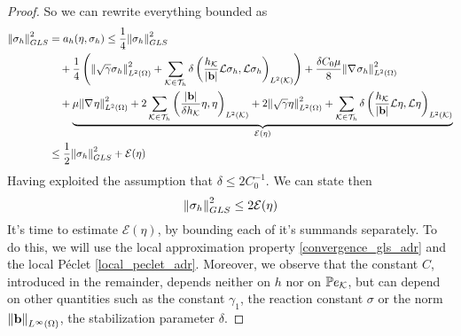 \begin{proof}
    So we can rewrite everything bounded as 
    \begin{align*}
        \norm{\sigma_h}^2_{GLS} &= a_h(\eta, \sigma_h) \leq \frac{1}{4} \norm{\sigma_h}^2_{GLS} \\
        &\quad + \frac{1}{4} \left( \norm{\sqrt{\gamma}\sigma_h}_{L^2(\Omega)}^2 + \sum_{\mathcal{K}\in\mathcal{T}_h} \delta \left( \frac{h_{\mathcal{K}}}{\abs{\textbf{b}}} \mathcal{L}\sigma_h,\mathcal{L} \sigma_h \right)_{L^2(\mathcal{K})} \right) + \frac{\delta C_0 \mu}{8} \norm{\nabla\mspace{1mu} \sigma_h}_{L^2(\Omega)}^2 \\
        &\quad + \underbrace{\mu\norm{\nabla\mspace{1mu} \eta}_{L^2(\Omega)}^2 + 2 \sum_{\mathcal{K}\in\mathcal{T}_h} \left( \frac{\abs{\textbf{b}}}{\delta h_{\mathcal{K}}} \eta, \eta \right)_{L^2(\mathcal{K})} + 2 \norm{\sqrt{\gamma}\eta}_{L^2(\Omega)}^2 + \sum_{\mathcal{K}\in\mathcal{T}_h} \delta \left( \frac{h_{\mathcal{K}}}{\abs{\textbf{b}}} \mathcal{L}\eta, \mathcal{L}\eta \right)_{L^2(\mathcal{K})}}_{\mathcal{E}(\eta)} \\
        &\leq \frac{1}{2} \norm{\sigma_h}_{GLS}^2 + \mathcal{E}(\eta)
    \end{align*}
    Having exploited the assumption that \(\delta \leq 2C^{-1}_0\). We can state then
    \[
        \norm{\sigma_h}_{GLS}^2 \leq 2\mathcal{E}(\eta)
    \]
    It's time to estimate \(\mathcal{E}(\eta)\), by bounding each of it's summands separately. To do this, we will use the local approximation property \eqref{convergence_gls_adr} and the local Péclet \eqref{local_peclet_adr}. Moreover, we observe that the constant \(C\), introduced in the remainder, depends neither on \(h\) nor on \(\mathbb{P}e_{\mathcal{K}}\), but can depend on other quantities such as the constant \(\gamma_1\), the reaction constant \(\sigma\) or the norm \(\norm{\textbf{b}}_{L^\infty(\Omega)}\), the stabilization parameter \(\delta\).


\end{proof}
